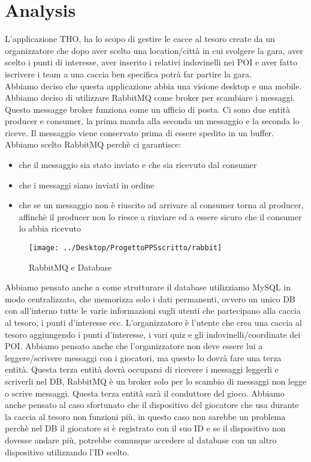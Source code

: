 \documentclass[10pt, english]{article}
\begin{document}
\section{Analysis}
L'applicazione THO, ha lo scopo di gestire le cacce al tesoro create da un organizzatore che dopo aver scelto una location/città in cui svolgere la gara, aver scelto i punti di interesse, aver inserito i relativi indovinelli nei POI e aver fatto iscrivere i team a una caccia ben specifica potrà far partire la gara.
\\Abbiamo deciso che questa applicazione abbia una visione desktop e una mobile.
\\Abbiamo deciso di utilizzare RabbitMQ come broker per scambiare i messaggi. Questo messagge broker funziona come un ufficio di posta. Ci sono due entità producer e consumer, la prima manda alla seconda un messaggio e la seconda lo riceve. Il messaggio viene conservato prima di essere spedito in un buffer. Abbiamo scelto RabbitMQ perchè ci garantisce:
\begin{itemize}
	\item che il messaggio sia stato inviato e che sia ricevuto dal consumer
	\item che i messaggi siano inviati in ordine
	\item che se un messaggio non è riuscito ad arrivare al consumer torna al producer, affinchè il producer non lo riesce a rinviare ed a essere sicuro che il consumer lo abbia ricevuto
\end{itemize}

\begin{figure}[H]
	\centering
	\texttt{[image: ../Desktop/ProgettoPPSscritto/rabbit]}
	\caption{RabbitMQ e Database}
\end{figure}

Abbiamo pensato anche a come strutturare il database utilizziamo MySQL in modo centralizzato, che memorizza solo i dati permanenti, ovvero un unico DB con all'interno tutte le varie informazioni sugli utenti che partecipano alla caccia al tesoro, i punti d'interesse ecc. L'organizzatore è l'utente che crea una caccia al tesoro aggiungendo i punti d'interesse, i vari quiz e gli indovinelli/coordinate dei POI. Abbiamo pensato anche che l'organizzatore non deve essere lui a leggere/scrivere messaggi con i giocatori, ma questo lo dovrà fare una terza entità. Questa terza entità dovrà occuparsi di ricevere i messaggi leggerli e scriverli nel DB, RabbitMQ è un broker solo per lo scambio di messaggi non legge o scrive messaggi. Questa terza entità  sarà il conduttore del gioco. Abbiamo anche pensato al caso sfortunato che il dispositivo del giocatore che usa durante la caccia al tesoro non funzioni più, in questo caso non sarebbe un problema perchè nel DB il giocatore si è registrato con il suo ID e se il dispositivo non dovesse andare più, potrebbe comunque accedere al database con un altro dispositivo utilizzando l'ID scelto.
\end{document}
